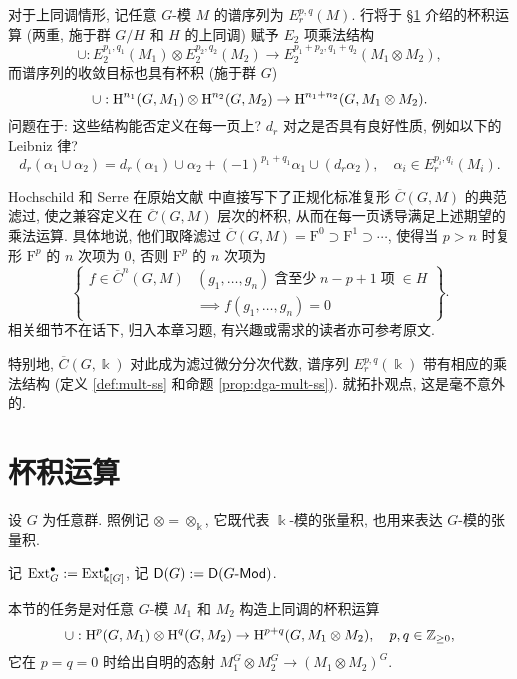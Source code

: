 \begin{remark}\label{rem:LHS-SS-mult}
	对于上同调情形, 记任意 $G$-模 $M$ 的谱序列为 $E_r^{p, q}(M)$. 行将于 \S\ref{sec:cup-product} 介绍的杯积运算 (两重, 施于群 $G/H$ 和 $H$ 的上同调) 赋予 $E_2$ 项乘法结构
	\[ \cup: E_2^{p_1, q_1}(M_1) \otimes E_2^{p_2, q_2}(M_2) \to E_2^{p_1 + p_2, q_1 + q_2}(M_1 \otimes M_2), \]
	而谱序列的收敛目标也具有杯积 (施于群 $G$)
	\[ \cup: \operatorname{H}^{n_1}(G, M_1) \otimes \operatorname{H}^{n_2}(G, M_2) \to \operatorname{H}^{n_1 + n_2}(G, M_1 \otimes M_2). \]
	问题在于: 这些结构能否定义在每一页上? $d_r$ 对之是否具有良好性质, 例如以下的 Leibniz 律?
	\[ d_r (\alpha_1 \cup \alpha_2) = d_r(\alpha_1) \cup \alpha_2 + (-1)^{p_1 + q_1} \alpha_1 \cup (d_r \alpha_2), \quad \alpha_i \in E_r^{p_i, q_i}(M_i). \]
		
	Hochschild 和 Serre 在原始文献 \cite[pp.118--119]{HS53} 中直接写下了正规化标准复形 $\overline{C}(G, M)$ 的典范滤过, 使之兼容定义在 $\overline{C}(G, M)$ 层次的杯积, 从而在每一页诱导满足上述期望的乘法运算. 具体地说, 他们取降滤过 $\overline{C}(G, M) = \mathrm{F}^0 \supset \mathrm{F}^1 \supset \cdots$, 使得当 $p > n$ 时复形 $\mathrm{F}^p$ 的 $n$ 次项为 $0$, 否则 $\mathrm{F}^p$ 的 $n$ 次项为
	\[ \left\{\begin{array}{r|l}
		f \in \overline{C}^n(G, M) & (g_1, \ldots, g_n) \;\text{含至少}\; n-p+1 \;\text{项}\; \in H \\
		& \implies f(g_1, \ldots, g_n) = 0
	\end{array}\right\}. \]
	相关细节不在话下, 归入本章习题, 有兴趣或需求的读者亦可参考原文.
	
	特别地, $\overline{C}(G, \Bbbk)$ 对此成为滤过微分分次代数, 谱序列 $E_r^{p, q}(\Bbbk)$ 带有相应的乘法结构 (定义 \ref{def:mult-ss} 和命题 \ref{prop:dga-mult-ss}). 就拓扑观点, 这是毫不意外的. 
\end{remark}

\section{杯积运算}\label{sec:cup-product}
设 $G$ 为任意群. 照例记 $\otimes = \otimes_{\Bbbk}$, 它既代表 $\Bbbk$-模的张量积, 也用来表达 $G$-模的张量积.

\begin{convention}
	记 $\operatorname{Ext}_G^\bullet := \operatorname{Ext}_{\Bbbk[G]}^\bullet$, 记 $\mathsf{D}(G) := \mathsf{D}(G\text{-}\mathsf{Mod})$.
\end{convention}

本节的任务是对任意 $G$-模 $M_1$ 和 $M_2$ 构造上同调的杯积运算
\[ \cup: \operatorname{H}^p(G, M_1) \otimes \operatorname{H}^q(G, M_2) \to \operatorname{H}^{p+q}(G, M_1 \otimes M_2), \quad p, q \in \mathbb{Z}_{\geq 0}, \]
它在 $p=q=0$ 时给出自明的态射 $M_1^G \otimes M_2^G \to (M_1 \otimes M_2)^G$.

